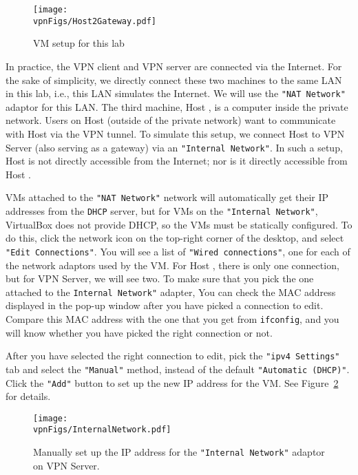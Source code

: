 \begin{figure}[htb]
\begin{center}
\texttt{[image: \\vpnFigs/Host2Gateway.pdf]}
\end{center}
\caption{VM setup for this lab}
\label{vpn:fig:host2gateway}
\end{figure}
 


In practice, the VPN client and VPN server are connected via the Internet.
For the sake of simplicity, we directly connect these two
machines to the same LAN in this lab, i.e., this LAN simulates the Internet. 
We will use the \texttt{"NAT Network"} adaptor for this LAN.
The third machine, Host \hostv, is a computer inside the private network. Users
on Host \hostu (outside of the private network) want to communicate with Host \hostv 
via the VPN tunnel. To simulate this setup, we connect Host \hostv to VPN Server
(also serving as a gateway) via an \texttt{"Internal Network"}.  In such a setup, 
Host \hostv is not directly accessible from the Internet; nor is it directly accessible 
from Host \hostu. 

VMs attached to the \texttt{"NAT Network"} network will automatically get their
IP addresses from the \texttt{DHCP} server, but for
VMs on the \texttt{"Internal Network"}, VirtualBox does not provide DHCP, so the
VMs must be statically configured. To do this, click the network icon on the top-right corner
of the desktop, and select \texttt{"Edit Connections"}. You will see a list
of \texttt{"Wired connections"}, one for each of the network adaptors used by the VM.
For Host \hostv, there is only one connection, but for VPN Server, we will see two. To make sure 
that you pick the one attached to the \texttt{Internal Network"} adapter, 
You can check the MAC address displayed in the pop-up window after you have 
picked a connection to edit. 
Compare this MAC address with the one that you get from \texttt{ifconfig},
and you will know whether you have picked the right connection or not. 


After you have selected the right connection to edit, 
pick the \texttt{"ipv4 Settings"} tab and select the 
\texttt{"Manual"} method, instead of the default \texttt{"Automatic (DHCP)"}. Click 
the \texttt{"Add"} button to set up the new IP address for the VM. See
Figure~\ref{vpn:fig:internalnetwork} for details. 



\begin{figure}[htb]
\begin{center}
\texttt{[image: \\vpnFigs/InternalNetwork.pdf]}
\end{center}
\caption{Manually set up the IP address for the \texttt{"Internal Network"} adaptor on VPN
Server.}
\label{vpn:fig:internalnetwork}
\end{figure}
 



